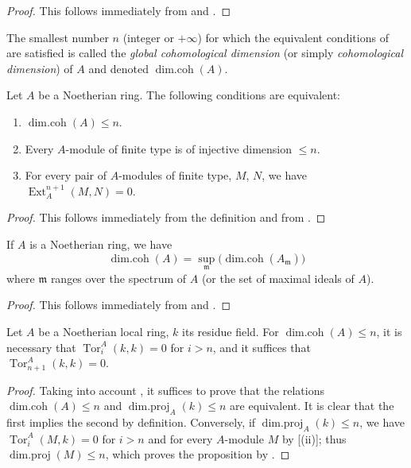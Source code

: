\begin{proof}
This follows immediately from  and .
\end{proof}

The smallest number $n$ (integer or $+\infty$) for which the equivalent conditions of  are satisfied is called the \emph{global cohomological dimension} (or simply \emph{cohomological dimension}) of $A$ and denoted $\operatorname{dim.coh}(A)$.

\begin{proposition}[17.2.9]
\label{0.17.2.9}
Let $A$ be a Noetherian ring.
The following conditions are equivalent:
\begin{enumerate}
  \item[{\rm a)}] $\operatorname{dim.coh}(A)\leq n$.
  \item[{\rm b)}] Every $A$-module of finite type is of injective dimension $\leq n$.
  \item[{\rm c)}] For every pair of $A$-modules of finite type, $M$, $N$, we have $\operatorname{Ext}^{n+1}_A(M,N)=0$.
\end{enumerate}
\end{proposition}

\begin{proof}
This follows immediately from the definition and from .
\end{proof}

\begin{corollary}[17.2.10]
\label{0.17.2.10}
If $A$ is a Noetherian ring, we have
\[
\label{0.17.2.10.1}
  \operatorname{dim.coh}(A)=\sup_\mathfrak{m}\big(\operatorname{dim.coh}(A_\mathfrak{m})\big)
  \tag{17.2.10.1}
\]
where $\mathfrak{m}$ ranges over the spectrum of $A$ (or the set of maximal ideals of $A$).
\end{corollary}

\begin{proof}
This follows immediately from  and .
\end{proof}

\begin{proposition}[17.2.11]
\label{0.17.2.11}
Let $A$ be a Noetherian local ring, $k$ its residue field.
For $\operatorname{dim.coh}(A)\leq n$, it is necessary that $\operatorname{Tor}^A_i(k,k)=0$ for $i>n$, and it suffices that $\operatorname{Tor}^A_{n+1}(k,k)=0$.
\end{proposition}

\begin{proof}
Taking into account , it suffices to prove that the relations $\operatorname{dim.coh}(A)\leq n$ and $\operatorname{dim.proj}_A(k)\leq n$ are equivalent.
It is clear that the first implies the second by definition.
Conversely, if $\operatorname{dim.proj}_A(k)\leq n$, we have $\operatorname{Tor}^A_i(M,k)=0$ for $i>n$ and for every $A$-module $M$ by [(ii)];
thus $\operatorname{dim.proj}(M)\leq n$, which proves the proposition by .
\end{proof}

